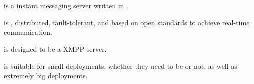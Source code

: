 \section{}
\label{sec:intro}



\ejabberd{} is a  instant messaging server written in .

\ejabberd{} is , distributed, fault-tolerant, and based on open standards to achieve real-time communication.

\ejabberd{} is designed to be a  XMPP server.

\ejabberd{} is suitable for small deployments, whether they need to be  or not, as well as extremely big deployments.







